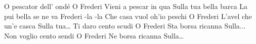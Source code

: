 \beginverse*
O pescator dell’ ondé
O Frederi
Vieni a pescar in qua
Sulla tua bella barca
La pui bella se ne va
Frederi -la -la
\endverse
\beginverse*
Che casa vuol oh’io peschi	
O Frederi			
L’avel che un’e casca		
Sulla tua…			
\endverse
\beginverse*
Ti daro cento scudi	
O Frederi		
Sta borsa ricanna	
Sulla...			
\endverse
\beginverse*
Non voglio cento sendi	
O Frederi		
Ne borsa ricanna	
Sulla…			
\endverse
\endsong